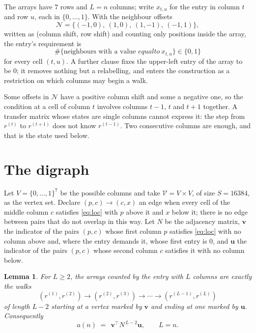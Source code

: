 \documentclass[11pt,a4paper]{article}
\theoremstyle{plain}
\newtheorem{lemma}[theorem]{Lemma}
\theoremstyle{definition}
\begin{document}
The arrays have $7$ rows and $L=n$ columns; write $x_{t,u}$ for the entry in
column $t$ and row $u$, each in $\{0,\dots,1\}$. With the neighbour offsets
\[
\mathcal N=\{(-1,0),\ (1,0),\ (1,-1),\ (-1,1)\},
\]
written as (column shift, row shift) and counting only positions inside the array, the
entry's requirement is
\begin{equation}\label{eq:loc}
\#\{\text{neighbours with a value }equal to\ x_{t,u}\}\in\{0,1\}
\end{equation}
for every cell $(t,u)$. A further clause fixes the upper-left entry of the array to be $0$; it removes nothing but a relabelling, and enters the construction as a restriction on which columns may begin a walk.

Some offsets in $\mathcal N$ have a positive column shift and some a negative one, so the
condition at a cell of column $t$ involves columns $t-1$, $t$ and $t+1$ together. A transfer
matrix whose states are single columns cannot express it: the step from $r^{(t)}$ to
$r^{(t+1)}$ does not know $r^{(t-1)}$. Two consecutive columns are enough, and that is
the state used below.

\section{The digraph}

Let $V=\{0,\dots,1\}^{7}$ be the possible columns and take
$\mathcal V=V\times V$, of size $S=16384$, as the vertex set. Declare $(p,c)\to(c,x)$ an edge
when every cell of the middle column $c$ satisfies \eqref{eq:loc} with $p$ above it and $x$
below it; there is no edge between pairs that do not overlap in this way. Let $N$ be the
adjacency matrix, $\mathbf{v}$ the indicator of the pairs $(p,c)$ whose first column $p$
satisfies \eqref{eq:loc} with no column above and, where the entry demands it, whose first entry is $0$, and $\mathbf{u}$ the indicator of
the pairs $(p,c)$ whose second column $c$ satisfies it with no column below.

\begin{lemma}\label{lem:walk}
For $L\ge2$, the arrays counted by the entry with $L$ columns are exactly the walks
\[
(r^{(1)},r^{(2)})\to(r^{(2)},r^{(3)})\to\cdots\to(r^{(L-1)},r^{(L)})
\]
of length $L-2$ starting at a vertex marked by $\mathbf{v}$ and ending at one marked by
$\mathbf{u}$. Consequently
\[
a(n)\;=\;\,\mathbf{v}^{\!\top}N^{\,L-2}\mathbf{u},\qquad L=n .
\]
\end{lemma}
\end{document}
